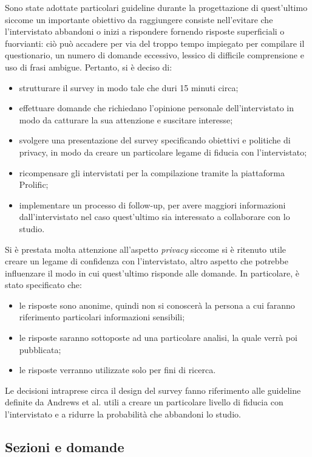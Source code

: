Sono state adottate particolari guideline durante la progettazione di quest'ultimo siccome un importante obiettivo da raggiungere consiste nell'evitare che l'intervistato abbandoni o inizi a rispondere fornendo risposte superficiali o fuorvianti: ciò può accadere per via del troppo tempo impiegato per compilare il questionario, un numero di domande eccessivo, lessico di difficile comprensione e uso di frasi ambigue. Pertanto, si è deciso di:
\begin{itemize}
    \item strutturare il survey in modo tale che duri 15 minuti circa;
    \item effettuare domande che richiedano l'opinione personale dell'intervistato in modo da catturare la sua attenzione e suscitare interesse;
    \item svolgere una presentazione del survey specificando obiettivi e politiche di privacy, in modo da creare un particolare legame di fiducia con l'intervistato;
    \item ricompensare gli intervistati per la compilazione tramite la piattaforma Prolific;
    \item implementare un processo di follow-up, per avere maggiori informazioni dall'intervistato nel caso quest'ultimo sia interessato a collaborare con lo studio.
\end{itemize}
Si è prestata molta attenzione all'aspetto \emph{privacy} siccome si è ritenuto utile creare un legame di confidenza con l'intervistato, altro aspetto che potrebbe influenzare il modo in cui quest'ultimo risponde alle domande. In particolare, è stato specificato che:
\begin{itemize}
    \item le risposte sono anonime, quindi non si conoscerà la persona a cui faranno riferimento particolari informazioni sensibili;
    \item le risposte saranno sottoposte ad una particolare analisi, la quale verrà poi pubblicata;
    \item le risposte verranno utilizzate solo per fini di ricerca.
\end{itemize}
Le decisioni intraprese circa il design del survey fanno riferimento alle guideline definite da Andrews et al. \cite{andrews2007conducting} utili a creare un particolare livello di fiducia con l'intervistato e a ridurre la probabilità che abbandoni lo studio.

\subsection{Sezioni e domande}

